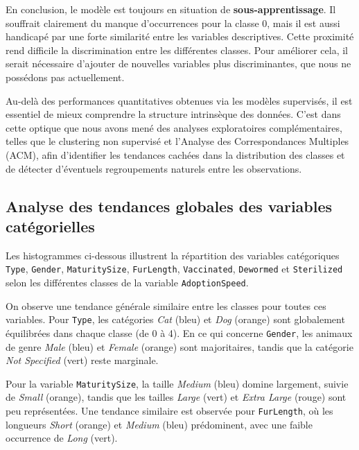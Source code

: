 \documentclass[a4paper,12pt]{article}
\begin{document}
\medskip

En conclusion, le modèle est toujours en situation de \textbf{sous-apprentissage}. Il souffrait clairement du manque d’occurrences pour la classe 0, mais il est aussi handicapé par une forte similarité entre les variables descriptives. Cette proximité rend difficile la discrimination entre les différentes classes. Pour améliorer cela, il serait nécessaire d’ajouter de nouvelles variables plus discriminantes, que nous ne possédons pas actuellement.


\bigskip

Au-delà des performances quantitatives obtenues via les modèles supervisés, il est essentiel de mieux comprendre la structure intrinsèque des données. C’est dans cette optique que nous avons mené des analyses exploratoires complémentaires, telles que le clustering non supervisé et l’Analyse des Correspondances Multiples (ACM), afin d’identifier les tendances cachées dans la distribution des classes et de détecter d’éventuels regroupements naturels entre les observations.

\subsection{Analyse des tendances globales des variables catégorielles}

Les histogrammes ci-dessous illustrent la répartition des variables catégoriques \texttt{Type}, \texttt{Gender}, \texttt{MaturitySize}, \texttt{FurLength}, \texttt{Vaccinated}, \texttt{Dewormed} et \texttt{Sterilized} selon les différentes classes de la variable \texttt{AdoptionSpeed}.

On observe une tendance générale similaire entre les classes pour toutes ces variables. Pour \texttt{Type}, les catégories \textit{Cat} (bleu) et \textit{Dog} (orange) sont globalement équilibrées dans chaque classe (de 0 à 4). En ce qui concerne \texttt{Gender}, les animaux de genre \textit{Male} (bleu) et \textit{Female} (orange) sont majoritaires, tandis que la catégorie \textit{Not Specified} (vert) reste marginale.

Pour la variable \texttt{MaturitySize}, la taille \textit{Medium} (bleu) domine largement, suivie de \textit{Small} (orange), tandis que les tailles \textit{Large} (vert) et \textit{Extra Large} (rouge) sont peu représentées. Une tendance similaire est observée pour \texttt{FurLength}, où les longueurs \textit{Short} (orange) et \textit{Medium} (bleu) prédominent, avec une faible occurrence de \textit{Long} (vert).
\end{document}

